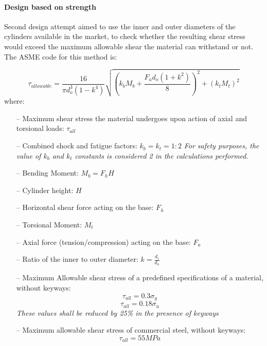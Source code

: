 \paragraph {Design based on strength}
Second design attempt aimed to use the inner and outer diameters of the cylinders available in the market, to check whether the resulting shear stress would exceed the maximum allowable shear the material can withstand or not. The ASME code for this method is:

\begin{equation}
\tau_{allowable} = \frac{16}{\pi d^{3}_{o} (1-k^{4})} \sqrt{(k_{b} M_{b} + \frac{F_{a} d_{o} (1+k^{2})}{8})^{2} + (k_{t} M_{t})^{2}}
\end{equation}
where:
\begin{itemize}
	\item [--] Maximum shear stress the material undergoes upon action of axial and torsional loads: $\tau_{all}$
	\item [--] Combined shock and fatigue factors: $k_{b} = k_{t} = 1 : 2 $
	\textit{For safety purposes, the value of $k_{b}$ and $k_{t}$ constants is considered 2 in the calculations performed.}
    \item [--] Bending Moment: $M_{b} = F_{h} H$
	\item [--] Cylinder height: $H$
	\item [--] Horizontal shear force acting on the base: $F_{h}$
	\item [--] Torsional Moment: $M_{t}$
	\item [--] Axial force (tension/compression) acting on the base: $F_{a}$
	\item [--] Ratio of the inner to outer diameter: $k = \frac{d_{i}}{d_{o}}$
	\item [--] Maximum Allowable shear stress of a predefined specifications of a material, without keyways:
	$$ \tau_{all} = 0.3 \sigma_{y} $$
	$$ \tau_{all} = 0.18 \sigma_{u} $$
	\textit{These values shall be reduced by 25\% in the presence of keyways}
	\item [--] Maximum allowable shear stress of commercial steel, without keyways:
	$$ \tau_{all} = 55 MPa $$
\end{itemize}

